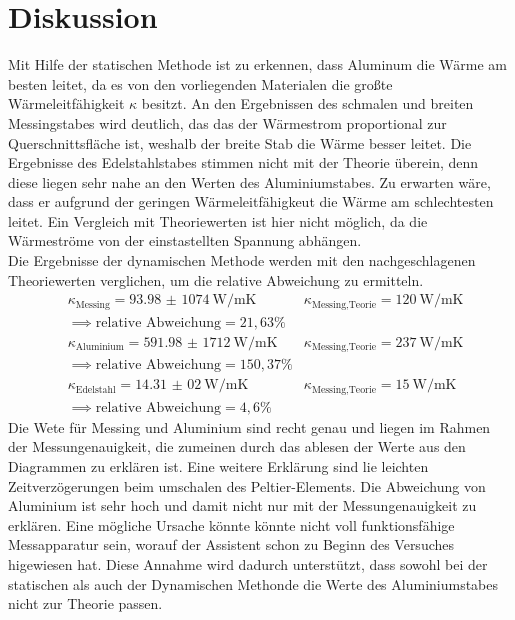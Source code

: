 \section{Diskussion}
Mit Hilfe der statischen Methode ist zu erkennen, dass Aluminum die Wärme am besten leitet, da
es von den vorliegenden Materialen die großte Wärmeleitfähigkeit $\kappa$ besitzt.
An den Ergebnissen des schmalen und breiten Messingstabes wird deutlich, das das der Wärmestrom
proportional zur Querschnittsfläche ist, weshalb der breite Stab die Wärme besser leitet.
Die Ergebnisse des Edelstahlstabes stimmen nicht mit der Theorie überein, denn diese
liegen sehr nahe an den Werten des Aluminiumstabes. Zu erwarten wäre, dass
er aufgrund der geringen Wärmeleitfähigkeut die Wärme am schlechtesten leitet.
Ein Vergleich mit Theoriewerten ist hier nicht möglich, da die Wärmeströme
von der einstastellten Spannung abhängen.
\\
Die Ergebnisse der dynamischen Methode werden mit den nachgeschlagenen Theoriewerten verglichen, um
die relative Abweichung zu ermitteln.
\begin{align*}
  &\kappa_{\text{Messing}} =\SI{93,98(1074)}{\W\per\meter\kelvin}   &\kappa_{\text{Messing,Teorie}} =\SI{120}{\W\per\meter\kelvin}\\
  &\implies \text{relative Abweichung}= 21,63\%\\
  &\kappa_{\text{Aluminium}}=\SI{591,98(1712)}{\W\per\meter\kelvin}  &\kappa_{\text{Messing,Teorie}} =\SI{237}{\W\per\meter\kelvin}\\
  &\implies \text{relative Abweichung}= 150,37\%\\
  &\kappa_{\text{Edelstahl}}=\SI{14,31(02)}{\W\per\meter\kelvin}   &\kappa_{\text{Messing,Teorie}} =\SI{15}{\W\per\meter\kelvin}\\
  &\implies \text{relative Abweichung}= 4,6\%
\end{align*}
Die Wete für Messing und Aluminium sind recht genau und liegen im Rahmen der Messungenauigkeit, die
zumeinen durch das ablesen der Werte aus den Diagrammen zu erklären ist. Eine weitere Erklärung sind
lie leichten Zeitverzögerungen beim umschalen des Peltier-Elements.
Die Abweichung von Aluminium ist sehr hoch und damit nicht nur mit der Messungenauigkeit zu erklären.
Eine mögliche Ursache könnte könnte nicht voll funktionsfähige Messapparatur sein, worauf der
Assistent schon zu Beginn des Versuches higewiesen hat. Diese Annahme wird dadurch unterstützt, dass
sowohl bei der statischen als auch der Dynamischen Methonde die Werte des Aluminiumstabes nicht zur Theorie passen.


\label{sec:Diskussion}
